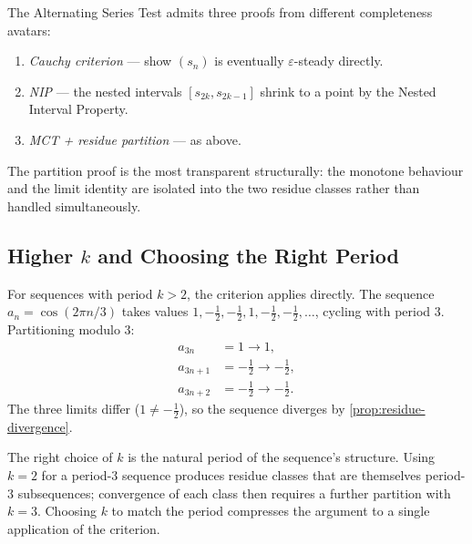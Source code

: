 

\begin{remark}
The Alternating Series Test admits three proofs from different
completeness avatars:
\begin{enumerate}
  \item \emph{Cauchy criterion} --- show $(s_n)$ is eventually
        $\varepsilon$-steady directly.
  \item \emph{NIP} --- the nested intervals $[s_{2k}, s_{2k-1}]$ shrink
        to a point by the Nested Interval Property.
  \item \emph{MCT + residue partition} --- as above.
\end{enumerate}
The partition proof is the most transparent structurally: the monotone
behaviour and the limit identity are isolated into the two residue classes
rather than handled simultaneously.
\end{remark}

\subsection*{Higher $k$ and Choosing the Right Period}
\label{subsec:higher-k}

For sequences with period $k > 2$, the criterion applies directly. The
sequence $a_n = \cos(2\pi n / 3)$ takes values $1, -\tfrac{1}{2},
-\tfrac{1}{2}, 1, -\tfrac{1}{2}, -\tfrac{1}{2}, \ldots$, cycling with
period $3$. Partitioning modulo $3$:
\begin{align*}
  a_{3n}   &= 1 \to 1, \\
  a_{3n+1} &= -\tfrac{1}{2} \to -\tfrac{1}{2}, \\
  a_{3n+2} &= -\tfrac{1}{2} \to -\tfrac{1}{2}.
\end{align*}
The three limits differ ($1 \neq -\tfrac{1}{2}$), so the sequence diverges
by \cref{prop:residue-divergence}.

\begin{remark}
The right choice of $k$ is the natural period of the sequence's structure.
Using $k = 2$ for a period-$3$ sequence produces residue classes that are
themselves period-$3$ subsequences; convergence of each class then requires
a further partition with $k = 3$. Choosing $k$ to match the period compresses
the argument to a single application of the criterion.
\end{remark}

